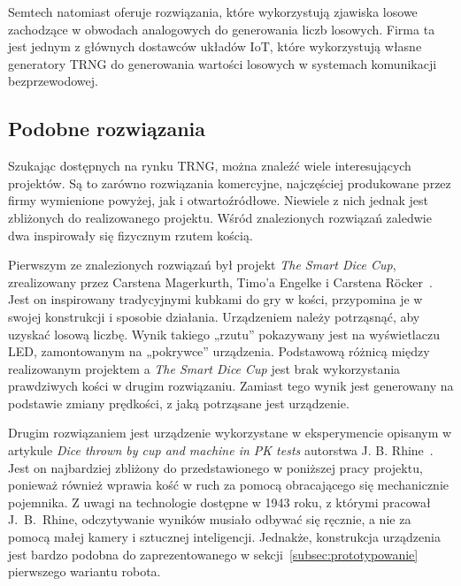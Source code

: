 Semtech natomiast oferuje rozwiązania, które wykorzystują zjawiska losowe
zachodzące w obwodach analogowych do generowania liczb losowych.
Firma ta jest jednym z głównych dostawców układów IoT, które wykorzystują własne generatory TRNG
do generowania wartości losowych w systemach komunikacji bezprzewodowej.


\subsection{Podobne rozwiązania}\label{sec:podobne-rozwiazania}

Szukając dostępnych na rynku TRNG, można znaleźć wiele interesujących projektów. Są to zarówno rozwiązania komercyjne, 
najczęściej produkowane przez firmy wymienione powyżej, jak i otwartoźródłowe. Niewiele z nich jednak jest zbliżonych 
do realizowanego projektu. Wśród znalezionych rozwiązań zaledwie dwa inspirowały się fizycznym rzutem kością.

Pierwszym ze znalezionych rozwiązań był projekt \textit{The Smart Dice Cup}, zrealizowany przez Carstena Magerkurth,
Timo'a Engelke i Carstena Röcker~\cite{SmartDice}.
Jest on inspirowany tradycyjnymi kubkami do gry w kości, przypomina je w swojej konstrukcji i sposobie działania.
Urządzeniem należy potrząsnąć, aby uzyskać losową liczbę.
Wynik takiego „rzutu” pokazywany jest na wyświetlaczu LED, zamontowanym na „pokrywce” urządzenia.
Podstawową różnicą między realizowanym projektem a \textit{The Smart Dice Cup} jest brak wykorzystania prawdziwych
kości w drugim rozwiązaniu.
Zamiast tego wynik jest generowany na podstawie zmiany prędkości, z jaką potrząsane jest urządzenie.

Drugim rozwiązaniem jest urządzenie wykorzystane w eksperymencie opisanym w artykule \textit{Dice thrown by cup and machine in PK tests} autorstwa J. B. Rhine~\cite{PK}.
Jest on najbardziej zbliżony do przedstawionego w poniższej pracy projektu, ponieważ również wprawia kość w
ruch za pomocą obracającego się mechanicznie pojemnika.
Z uwagi na technologie dostępne w 1943 roku, z którymi pracował J.~B.~Rhine, odczytywanie wyników musiało odbywać się ręcznie, a nie za pomocą małej kamery i sztucznej inteligencji.
Jednakże, konstrukcja urządzenia jest bardzo podobna do zaprezentowanego w sekcji~\ref{subsec:prototypowanie} pierwszego wariantu robota.